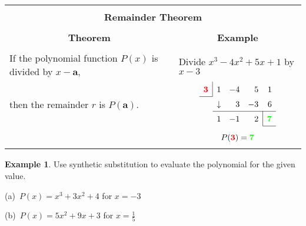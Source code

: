 \documentclass{report}
\theoremstyle{definition}
\newtheorem{example}{\bf Example}
\begin{document}
\begin{center}
	\begin{tabular}{|l|l|}
		\hline
		\multicolumn{2}{|c|}{}\\
		\multicolumn{2}{|c|}{\large\textbf{Remainder Theorem}\normalsize}\\ 
		\hline
		&\\
		\multicolumn{1}{|c|}{\textbf{Theorem}} & \multicolumn{1}{c|}{\textbf{Example}}\\
		\hline
		&\\
		If the polynomial function $P(x)$ is divided by $x-\mathbf{a}$,& Divide $x^3-4x^2+5x+1$ by $x-3$\\
		 then the remainder $r$ is $P(\mathbf{a})$.  & 
		 \multicolumn{1}{c|}{$
			\renewcommand\arraystretch{1.5}
			\setlength\doublerulesep{0pt}
			\begin{array}{rrrrr}
				\multicolumn{1}{r|}{\color{red}\mathbf{3}\color{black}} & 1 & -4 & 5 & 1\\\cline{0-0}
			 	& \downarrow & 3& -3 & 6 \\\cline{2-5}
			 	& 1 & -1 & 2 & \multicolumn{1}{|r}{\color{green}\mathbf{7}\color{black}}\\\cline{5-5}
			\end{array}
		$}\\
				&\\
		&\multicolumn{1}{c|}{$P(\color{red}\mathbf{3}\color{black})=\color{green}\mathbf{7}\color{black}$}\\
		&\\
		\hline
	\end{tabular}
\end{center}

\begin{example}
Use synthetic substitution to evaluate the polynomial for the given value.
\end{example}

\begin{minipage}[t]{0.45\linewidth}
(a) \,$P(x)=x^3+3x^2+4$ for $x=-3$
\end{minipage}
 \hfill
\begin{minipage}[t]{0.45\linewidth}
(b) \,$P(x)=5x^2+9x+3$ for $x=\displaystyle\frac{1}{5}$
\end{minipage}
\vfill

 
 \noindent{}
 
 
 \newpage
\end{document}
